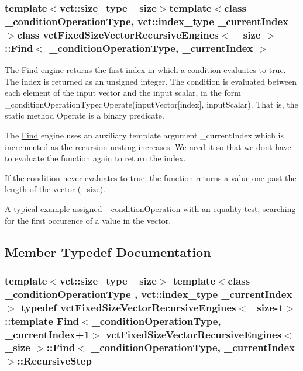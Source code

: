 \subsubsection*{template$<$vct\+::size\+\_\+type \+\_\+size$>$template$<$class \+\_\+condition\+Operation\+Type, vct\+::index\+\_\+type \+\_\+current\+Index$>$class vct\+Fixed\+Size\+Vector\+Recursive\+Engines$<$ \+\_\+size $>$\+::\+Find$<$ \+\_\+condition\+Operation\+Type, \+\_\+current\+Index $>$}

The \hyperlink{classvct_fixed_size_vector_recursive_engines_1_1_find}{Find} engine returns the first index in which a condition evaluates to \textquotesingle{}true\textquotesingle{}. The index is returned as an unsigned integer. The condition is evaluated between each element of the input vector and the input scalar, in the form {\ttfamily  \+\_\+condition\+Operation\+Type\+::\+Operate(input\+Vector\mbox{[}index\mbox{]}, input\+Scalar)}. That is, the static method Operate is a binary predicate.

The \hyperlink{classvct_fixed_size_vector_recursive_engines_1_1_find}{Find} engine uses an auxiliary template argument {\ttfamily \+\_\+current\+Index} which is incremented as the recursion nesting increases. We need it so that we don\textquotesingle{}t have to evaluate the function again to return the index.

If the condition never evaluates to true, the function returns a value one past the length of the vector ({\ttfamily \+\_\+size}).

A typical example assigned {\ttfamily \+\_\+condition\+Operation} with an equality test, searching for the first occurence of a value in the vector. 

\subsection{Member Typedef Documentation}
\hypertarget{classvct_fixed_size_vector_recursive_engines_1_1_find_aae2588d04bd3f2f1cd9daff01c63f334}{}
\subsubsection[{Recursive\+Step}]{\setlength{\rightskip}{0pt plus 5cm}template$<$vct\+::size\+\_\+type \+\_\+size$>$ template$<$class \+\_\+condition\+Operation\+Type , vct\+::index\+\_\+type \+\_\+current\+Index$>$ typedef {\bf vct\+Fixed\+Size\+Vector\+Recursive\+Engines}$<$\+\_\+size-\/1$>$\+::template {\bf Find}$<$\+\_\+condition\+Operation\+Type, \+\_\+current\+Index+1$>$ {\bf vct\+Fixed\+Size\+Vector\+Recursive\+Engines}$<$ \+\_\+size $>$\+::{\bf Find}$<$ \+\_\+condition\+Operation\+Type, \+\_\+current\+Index $>$\+::{\bf Recursive\+Step}}\label{classvct_fixed_size_vector_recursive_engines_1_1_find_aae2588d04bd3f2f1cd9daff01c63f334}


